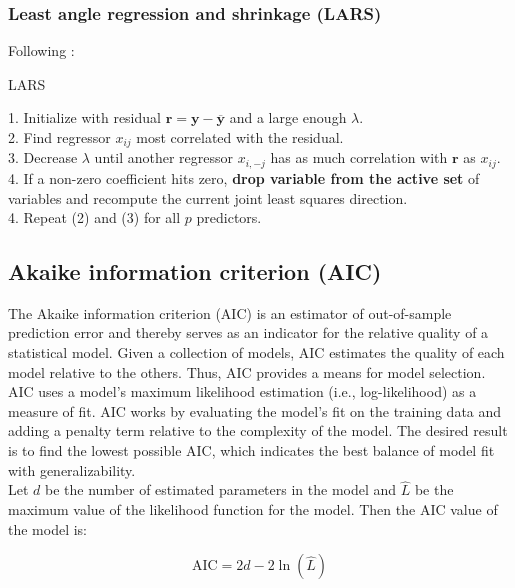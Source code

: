 \subsubsection{Least angle regression and shrinkage (LARS)}
\noindent Following \cite{hastie2008elements}:

\begin{algorithm}[H]
\caption{LARS}\label{alg:2}
1. Initialize with residual $\mathbf{r}=\mathbf{y}-\overline{\mathbf{y}}$ and a large enough $\lambda$. \\
2. Find regressor $x_{ij}$ most correlated with the residual. \\
3. Decrease $\lambda$ until another regressor $x_{i,-j}$ has as much correlation with $\mathbf{r}$ as $x_{ij}$. \\
4. If a non-zero coefficient hits zero, \textbf{drop variable from the active set}
of variables and recompute the current joint least squares direction.\\
4. Repeat (2) and (3) for all $p$ predictors.

\end{algorithm}

\subsection{Akaike information criterion (AIC)}

\noindent The Akaike information criterion (AIC) \citep{akaike1974new} is an estimator of out-of-sample prediction error and thereby serves as an indicator for the relative quality of a statistical model. Given a collection of models, AIC estimates the quality of each model relative to the others. Thus, AIC provides a means for model selection. AIC uses a model’s maximum likelihood estimation (i.e., log-likelihood) as a measure of fit. AIC works by evaluating the model’s fit on the training data and adding a penalty term relative to the complexity of the model. The desired result is to find the lowest possible AIC, which indicates the best balance of model fit with generalizability.\\

\noindent Let $d$ be the number of estimated parameters in the model and $\hat{L}$ be the maximum value of the likelihood function for the model. Then the AIC value of the model is:

\begin{equation}
\mathrm{AIC}=2 d-2 \ln (\hat{L})
\end{equation}

